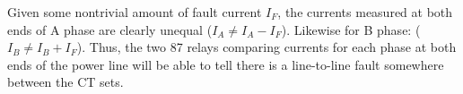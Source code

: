 Given some nontrivial amount of fault current $I_F$, the currents measured at both ends of A phase are clearly unequal ($I_A \neq I_A - I_F$).  Likewise for B phase: ($I_B \neq I_B + I_F$).  Thus, the two 87 relays comparing currents for each phase at both ends of the power line will be able to tell there is a line-to-line fault somewhere between the CT sets.










